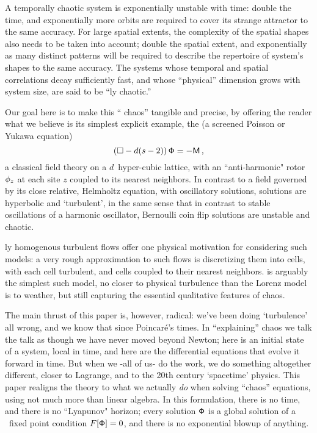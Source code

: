 

\bigskip

\noindent
A temporally chaotic system is exponentially unstable with time: double the
time, and exponentially more orbits are required to cover its strange
attractor to the same accuracy. For large spatial extents, the complexity of
the spatial shapes also needs to be taken into account; double the spatial
extent, and exponentially as many distinct
{\spt} patterns will be required to describe the repertoire of
system's shapes to the same accuracy.
The systems whose temporal and spatial correlations decay sufficiently fast,
and whose ``physical'' dimension grows with
system size, are said to be ``{\spt}ly chaotic.''

Our goal here is to make this ``{\spt} chaos'' tangible and precise, by
offering the reader what we believe is its simplest explicit
example, the {\em \catlatt}
(a screened Poisson or Yukawa equation)
\[
 (\Box -d(s-2))\,\mathsf{\Phi}  =  -\mathsf{M}
 \,,
\]
a classical field theory on a $d$\dmn\ hyper-cubic lattice, with an
``anti-harmonic" rotor $\phi_{z}$ at each site $z$ coupled to its nearest
neighbors.
In contrast to a field governed by its close relative, Helmholtz equation, with
oscillatory solutions, {\catlatt} solutions are hyperbolic and
`turbulent', in the same sense that in contrast to stable oscillations of
a harmonic oscillator, Bernoulli coin flip solutions are unstable and
chaotic.

{\Spt}ly homogenous turbulent flows offer one physical motivation for
considering such models: a very rough approximation to such flows is
discretizing them into {\spt} cells, with each cell turbulent, and cells
coupled to their nearest neighbors.  {\catLatt} is arguably the simplest
such model, no closer to physical turbulence than the Lorenz
model is to weather, but still capturing the essential
qualitative features of {\spt} chaos.

The main thrust of this paper is, however, radical: we've been doing
`turbulence' all wrong, and we know that since Poincar{\'e}'s times. In
``explaining'' chaos we talk the talk as though we have never moved
beyond Newton; here is an initial state of a system, local in time, and
here are the differential equations that evolve it forward in time. But
when we -all of us- do the work, we do something altogether different,
closer to Lagrange, and to the 20th century `spacetime' physics. This
paper realigns the theory to what we actually {\em do} when solving
``chaos'' equations, using not much more than linear algebra. In this
formulation, there is no time, and there is no ``Lyapunov" horizon; every
solution $\mathsf{\Phi}$ is a global solution of a \spt\ fixed point condition
$F[\mathsf{\Phi}]=0$, and there is no exponential blowup of anything.

